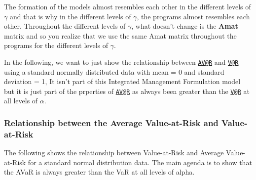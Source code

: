 \documentclass[]{article}
\begin{document}
The formation of the models almost resembles each other in the different
levels of \(\gamma\) and that is why in the different levels of
\(\gamma\), the programs almost resembles each other. Throughout the
different levels of \(\gamma\), what doesn't change is the \textbf{Amat}
matrix and so you realize that we use the same Amat matrix throughout
the programs for the different levels of \(\gamma\).

In the following, we want to just show the relationship between
\href{mailto:AV@R}{\nolinkurl{AV@R}} and
\href{mailto:V@R}{\nolinkurl{V@R}} using a standard normally distributed
data with mean = 0 and standard deviation = 1, It isn't part of this
Integrated Management Formulation model but it is just part of the
prperties of \href{mailto:AV@R}{\nolinkurl{AV@R}} as always been greater
than the \href{mailto:V@R}{\nolinkurl{V@R}} at all levels of \(\alpha\).

\subsubsection{Relationship between the Average Value-at-Risk and
Value-at-Risk}\label{relationship-between-the-average-value-at-risk-and-value-at-risk}

The following shows the relationship between Value-at-Risk and Average
Value-at-Risk for a standard normal distribution data. The main agenda
is to show that the AVaR is always greater than the VaR at all levels of
alpha.
\end{document}
